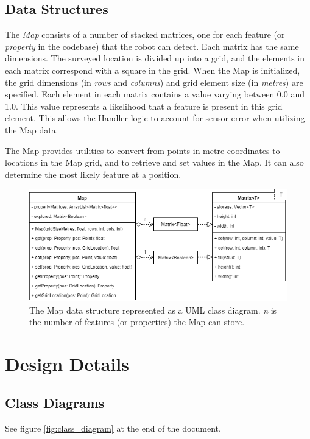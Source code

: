 \documentclass[12pt,a4paper]{article}
\begin{document}
\subsection{Data Structures}
The \textit{Map} consists of a number of stacked matrices, one for each feature (or \textit{property} in the codebase) that the robot can detect. Each matrix has the same dimensions. The surveyed location is divided up into a grid,  and the elements in each matrix correspond with a square in the grid. When the Map is initialized, the grid dimensions (in \textit{rows} and \textit{columns}) and grid element size (in \textit{metres}) are specified.
Each element in each matrix contains a value varying between 0.0 and 1.0. This value represents a likelihood that a feature is present in this grid element. This allows the Handler logic to account for sensor error when utilizing the Map data.

The Map provides utilities to convert from points in metre coordinates to locations in the Map grid, and to retrieve and set values in the Map. It can also determine the most likely feature at a position.

\begin{figure}
	\caption{The Map data structure represented as a UML class diagram. \textit{n} is the number of features (or properties) the Map can store.}
	\centering
		\includegraphics[width=1.0\textwidth]{MapDataStructure}
\end{figure}

\section{Design Details}
\subsection{Class Diagrams}
See figure \ref{fig:class_diagram} at the end of the document.
\end{document}
